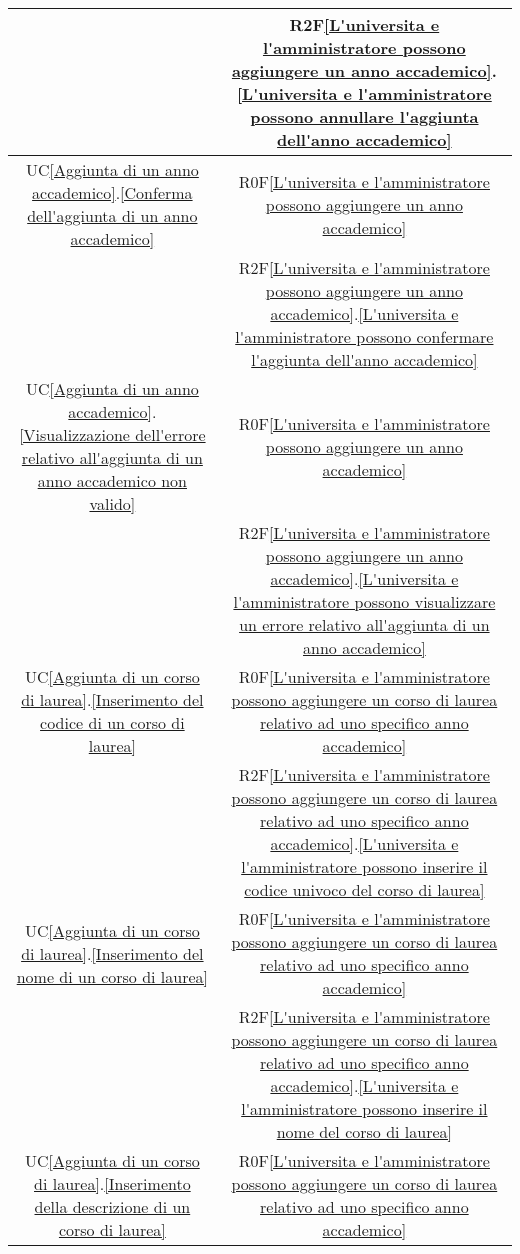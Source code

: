 \begin{longtable}{|c|c|}
& R2F\ref{L'universita e l'amministratore possono aggiungere un anno accademico}.\ref{L'universita e l'amministratore possono annullare l'aggiunta dell'anno accademico}\\
\hline
UC\ref{Aggiunta di un anno accademico}.\ref{Conferma dell'aggiunta di un anno accademico} & R0F\ref{L'universita e l'amministratore possono aggiungere un anno accademico}\\
& R2F\ref{L'universita e l'amministratore possono aggiungere un anno accademico}.\ref{L'universita e l'amministratore possono confermare l'aggiunta dell'anno accademico}\\
\hline
UC\ref{Aggiunta di un anno accademico}.\ref{Visualizzazione dell'errore relativo all'aggiunta di un anno accademico non valido} & R0F\ref{L'universita e l'amministratore possono aggiungere un anno accademico}\\
& R2F\ref{L'universita e l'amministratore possono aggiungere un anno accademico}.\ref{L'universita e l'amministratore possono visualizzare un errore relativo all'aggiunta di un anno accademico}\\
\hline
UC\ref{Aggiunta di un corso di laurea}.\ref{Inserimento del codice di un corso di laurea} & R0F\ref{L'universita e l'amministratore possono aggiungere un corso di laurea relativo ad uno specifico anno accademico}\\
& R2F\ref{L'universita e l'amministratore possono aggiungere un corso di laurea relativo ad uno specifico anno accademico}.\ref{L'universita e l'amministratore possono inserire il codice univoco del corso di laurea}\\
\hline
UC\ref{Aggiunta di un corso di laurea}.\ref{Inserimento del nome di un corso di laurea} & R0F\ref{L'universita e l'amministratore possono aggiungere un corso di laurea relativo ad uno specifico anno accademico}\\
& R2F\ref{L'universita e l'amministratore possono aggiungere un corso di laurea relativo ad uno specifico anno accademico}.\ref{L'universita e l'amministratore possono inserire il nome del corso di laurea}\\
\hline
UC\ref{Aggiunta di un corso di laurea}.\ref{Inserimento della descrizione di un corso di laurea} & R0F\ref{L'universita e l'amministratore possono aggiungere un corso di laurea relativo ad uno specifico anno accademico}\\

\end{longtable}
